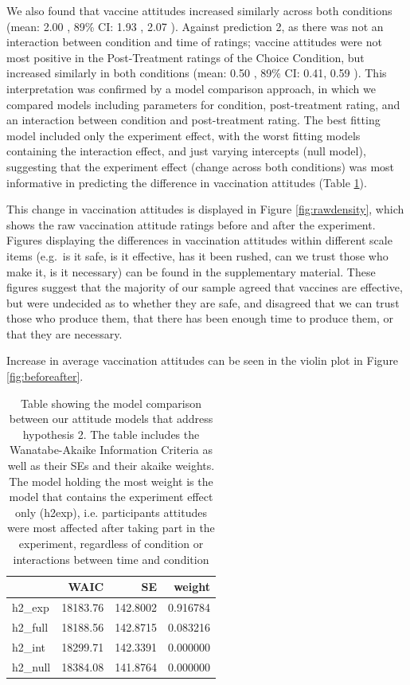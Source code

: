 \documentclass[
  english,
  ,jou,floatsintext]{apa6}
\begin{document}
We also found that vaccine attitudes increased similarly across both conditions (mean: 2.00 , 89\% CI: 1.93 , 2.07 ). Against prediction 2, as there was not an interaction between condition and time of ratings; vaccine attitudes were not most positive in the Post-Treatment ratings of the Choice Condition, but increased similarly in both conditions (mean: 0.50 , 89\% CI: 0.41, 0.59 ). This interpretation was confirmed by a model comparison approach, in which we compared models including parameters for condition, post-treatment rating, and an interaction between condition and post-treatment rating. The best fitting model included only the experiment effect, with the worst fitting models containing the interaction effect, and just varying intercepts (null model), suggesting that the experiment effect (change across both conditions) was most informative in predicting the difference in vaccination attitudes (Table \ref{tab:h2waics}).

This change in vaccination attitudes is displayed in Figure \ref{fig:rawdensity}, which shows the raw vaccination attitude ratings before and after the experiment. Figures displaying the differences in vaccination attitudes within different scale items (e.g.~is it safe, is it effective, has it been rushed, can we trust those who make it, is it necessary) can be found in the supplementary material. These figures suggest that the majority of our sample agreed that vaccines are effective, but were undecided as to whether they are safe, and disagreed that we can trust those who produce them, that there has been enough time to produce them, or that they are necessary.

Increase in average vaccination attitudes can be seen in the violin plot in Figure \ref{fig:beforeafter}.

\begin{table}

\caption{\label{tab:h2waics}Table showing the model comparison between our attitude models that address hypothesis 2. The table includes the Wanatabe-Akaike Information Criteria as well as their SEs and their akaike weights. The model holding the most weight is the model that contains the experiment effect only (h2exp), i.e. participants attitudes were most affected after taking part in the experiment, regardless of condition or interactions between time and condition  }
\centering
\begin{tabular}[t]{l|r|r|r}
\hline
  & WAIC & SE & weight\\
\hline
h2\_exp & 18183.76 & 142.8002 & 0.916784\\
\hline
h2\_full & 18188.56 & 142.8715 & 0.083216\\
\hline
h2\_int & 18299.71 & 142.3391 & 0.000000\\
\hline
h2\_null & 18384.08 & 141.8764 & 0.000000\\
\hline
\end{tabular}
\end{table}
\end{document}
